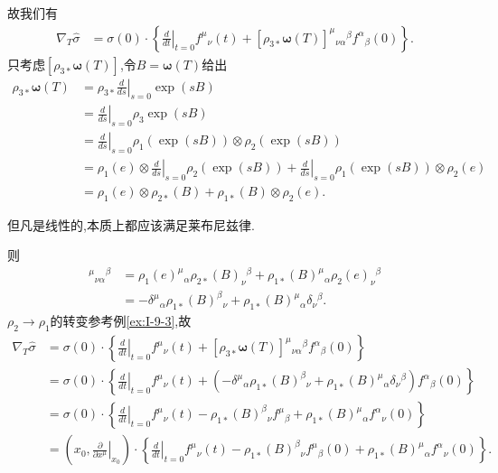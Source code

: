 \documentclass[../main.tex]{subfiles}
\begin{document}
    故我们有
    \begin{align*}
      \nabla _T \hat{\sigma} &= \sigma(0) \cdot \left\{\left.\frac{d}{dt}\right|_{t = 0} f^{\mu}{}_{\nu}(t) + [\rho_{3*} \bm{\omega}(T) ]^{\mu}{}_{\nu\alpha}{}^{\beta}f^{\alpha}{}_{\beta} (0) \right\}
    .\end{align*}
    只考虑$[\rho_{3*} \bm{\omega}(T) ]$,令$B = \bm{\omega}(T) $给出
    \begin{align*}
      \rho_{3*} \bm{\omega}(T)  & = \rho_{3*}\left.\frac{d}{ds}\right|_{s = 0} \exp(sB) \\
                                & = \left.\frac{d}{ds}\right|_{s = 0} \rho_{3} \exp(sB) \\
                                & = \left.\frac{d}{ds}\right|_{s = 0} \rho_1(\exp(sB)) \otimes \rho_2(\exp(sB))\\
                                & = \rho_1(e) \otimes \left.\frac{d}{ds}\right|_{s = 0} \rho_2(\exp(sB)) + \left.\frac{d}{ds}\right|_{s = 0} \rho_1 (\exp (sB)) \otimes \rho_2(e)\\
                                & = \rho_1(e) \otimes \rho_{2*}(B) + \rho_{1*}(B) \otimes \rho_2(e)
    .\end{align*}
    \begin{note}
      但凡是线性的,本质上都应该满足莱布尼兹律.
    \end{note}
    则
    \begin{align*}
      [\rho_{3*}B]^{\mu}{}_{\nu\alpha}{}^{\beta} &=  \rho_1(e)^{\mu}{}_{\alpha}  \rho_{2*}(B)_{\nu}{}^{\beta} + \rho_{1*}(B)^{\mu}{}_{\alpha}  \rho_2(e)_{\nu}{}^{\beta}\\
                                                 & = - \delta^{\mu}{}_{\alpha}  \rho_{1*}(B)^{\beta}{}_{\nu}+ \rho_{1*}(B)^{\mu}{}_{\alpha}  \delta_{\nu}{}^{\beta}
    .\end{align*}
    $\rho_2\to \rho_1$的转变参考例\ref{ex:I-9-3},故
    \begin{align*}
            \nabla _T \hat{\sigma} &= \sigma(0) \cdot \left\{\left.\frac{d}{dt}\right|_{t = 0} f^{\mu}{}_{\nu}(t) + [\rho_{3*} \bm{\omega}(T) ]^{\mu}{}_{\nu\alpha}{}^{\beta}f^{\alpha}{}_{\beta} (0) \right\}\\
                                   & = \sigma(0) \cdot \left\{\left.\frac{d}{dt}\right|_{t = 0} f^{\mu}{}_{\nu}(t) +( - \delta^{\mu}{}_{\alpha}  \rho_{1*}(B)^{\beta}{}_{\nu}+ \rho_{1*}(B)^{\mu}{}_{\alpha}  \delta_{\nu}{}^{\beta})f^{\alpha}{}_{\beta}(0)   \right\} \\
                                   & = \sigma(0) \cdot \left\{\left.\frac{d}{dt}\right|_{t = 0} f^{\mu}{}_{\nu}(t)  -  \rho_{1*}(B)^{\beta}{}_{\nu} f^{\mu}{}_{\beta}+ \rho_{1*}(B)^{\mu}{}_{\alpha} f^{\alpha}{}_{\nu}(0)   \right\}\\
                                   & = (x_0,\left.\frac{\partial}{\partial x^\mu}\right|_{x_0} ) \cdot \left\{\left.\frac{d}{dt}\right|_{t = 0} f^{\mu}{}_{\nu}(t)  -  \rho_{1*}(B)^{\beta}{}_{\nu} f^{\mu}{}_{\beta}(0)+ \rho_{1*}(B)^{\mu}{}_{\alpha} f^{\alpha}{}_{\nu}(0)   \right\}
    .\end{align*}
\end{document}
